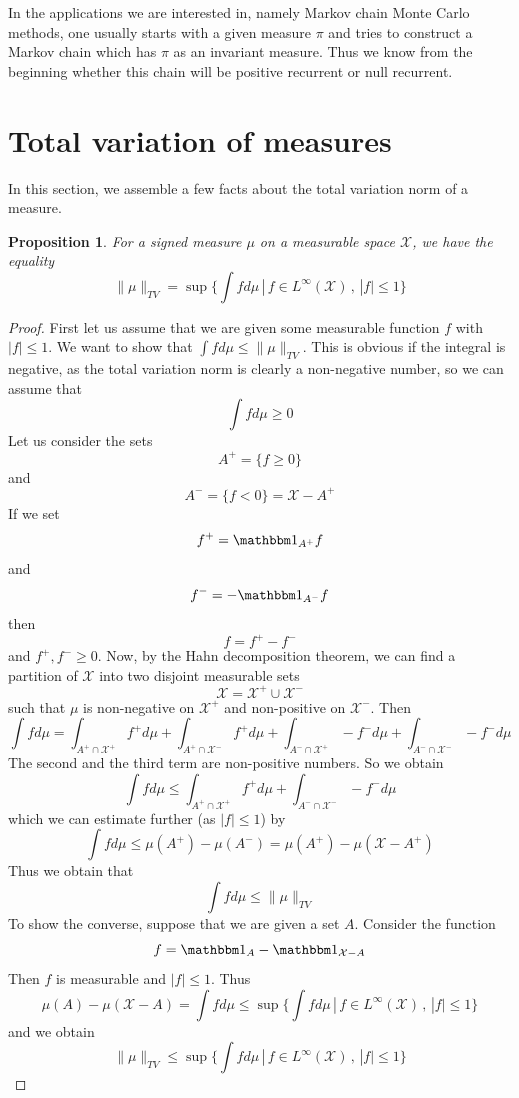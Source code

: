 \documentclass[a4paper, draft]{article}
\theoremstyle{own}
\newtheorem{prop}[thm]{Proposition}
\theoremstyle{remark}
\begin{document}
In the applications we are interested in, namely Markov chain Monte Carlo methods, one usually starts with a given measure $\pi$ and tries to construct a Markov chain which has $\pi$ as an invariant measure. Thus we know from the beginning whether this chain will be positive recurrent or null recurrent. 


\section{Total variation of measures}\label{sec:totalvariationnorm}

In this section, we assemble a few facts about the total variation norm of a measure.

\begin{prop}
	For a signed measure $\mu$ on a measurable space ${\mathcal X}$, we have the equality
	$$
	\| \mu \|_{TV} = \sup \{  \int f d\mu \, | \, f \in L^\infty({\mathcal X}) \, , \, |f| \leq 1   \}
	$$
\end{prop}

\begin{proof}
	First let us assume that we are given some measurable function $f$ with $|f| \leq 1$. We want to show that $\int f d\mu \leq \| \mu \|_{TV}$. This is obvious if the integral is negative, as the total variation norm is clearly a non-negative number, so we can assume that 
	$$
	\int f d\mu \geq 0
	$$
	Let us consider the sets
	$$
	A^+ = \{ f \geq 0 \}
	$$
	and 
	$$
	A^- = \{ f < 0 \} = {\mathcal X} - A^+
	$$
	If we set 
	$$
	f^+ = {\mathbbm 1}_{A^+} f 
	$$
	and
	$$
	f^- = - {\mathbbm 1}_{A^-} f 
	$$
	then
	$$
	f = f^+ - f^-
	$$
	and $f^+, f^- \geq 0$. 
	Now, by the Hahn decomposition theorem, we can find a partition of ${\mathcal X}$ into two disjoint measurable sets
	$$
	{\mathcal X} = {\mathcal X}^+ \cup {\mathcal X}^-
	$$
	such that $\mu$ is non-negative on ${\mathcal X}^+$ and non-positive on 
	${\mathcal X}^-$. Then
	$$
	\int f d\mu = \int_{A^+ \cap {\mathcal X}^+} f^+ d\mu  +
	\int_{A^+ \cap {\mathcal X}^-} f^+  d\mu
	+ \int_{A^- \cap {\mathcal X}^+} - f^- d\mu  
	+ \int_{A^- \cap {\mathcal X}^-} - f^- d\mu 
	$$
	The second and the third term are non-positive numbers. So we obtain
	$$
	\int f d\mu \leq \int_{A^+ \cap {\mathcal X}^+} f^+ d\mu  +  \int_{A^- \cap {\mathcal X}^-} - f^- d\mu 
	$$
	which we can estimate further (as $|f| \leq 1$) by
	$$
	\int f d\mu \leq  \mu(A^+) - \mu(A^-) = \mu(A^+) - \mu({\mathcal X} - A^+)
	$$
	Thus we obtain that 
	$$
	\int f d\mu \leq \| \mu \|_{TV}
	$$
	To show the converse, suppose that we are given a set $A$. Consider the function 
	$$
	f = {\mathbbm 1}_A - {\mathbbm 1}_{{\mathcal X} - A}
	$$
	Then $f$ is measurable and $|f| \leq 1$. Thus
	$$
	\mu(A) - \mu({\mathcal X} - A) = \int f d\mu \leq \sup \{  \int f d\mu \, | \, f \in L^\infty({\mathcal X}) \, , \, |f| \leq 1   \}
	$$
	and we obtain 
	$$
	\| \mu \|_{TV} \leq \sup \{  \int f d\mu \, | \, f \in L^\infty({\mathcal X}) \, , \, |f| \leq 1   \}
	$$
\end{proof}
\end{document}
